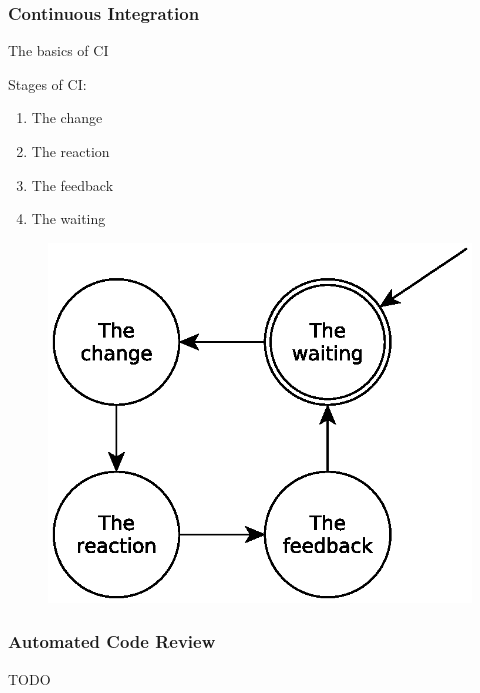 \documentclass[10pt,xcolor=pdflatex]{beamer}
\begin{document}
\begin{frame}\frametitle{Continuous Integration}
	\begin{centering}
		\large{The basics of CI}\\[1em]
	\end{centering}
	\begin{multicols}{2}
		Stages of CI:
		\begin{enumerate}
			\item The change
			\item The reaction
			\item The feedback
			\item The waiting 
		\end{enumerate}
		\begin{figure}[H]
			\centering
			\includegraphics[scale=0.5]{eps/stages_of_ci.eps}
		\end{figure}
	\end{multicols}
\end{frame}

\begin{frame}\frametitle{Automated Code Review}
	TODO
\end{frame}

\end{document}
